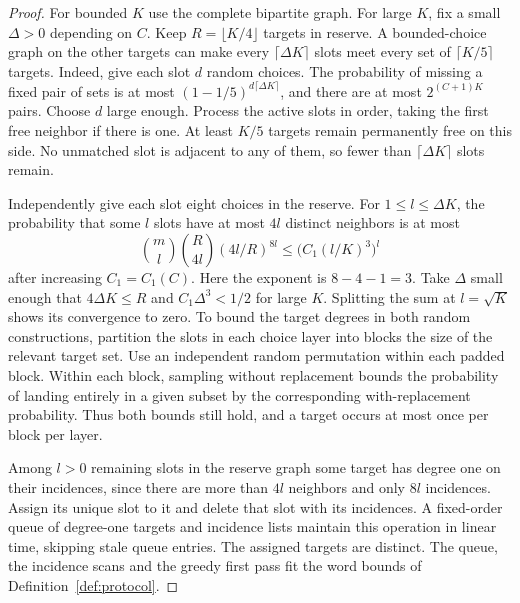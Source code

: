 \begin{proof}
For bounded $K$ use the complete bipartite graph. For large $K$, fix a small $\Delta>0$ depending
on $C$. Keep $R=\lfloor K/4\rfloor$ targets in reserve. A bounded-choice
graph on the other targets can make every $\lceil\Delta K\rceil$ slots
meet every set of $\lceil K/5\rceil$ targets. Indeed, give each slot
$d$ random choices. The probability of missing a fixed pair of sets
is at most $(1-1/5)^{d\lceil\Delta K\rceil}$, and there are at most
$2^{(C+1)K}$ pairs. Choose $d$ large enough. Process the active
slots in order, taking the first free neighbor if there is one.
At least $K/5$ targets remain permanently free on this side. No
unmatched slot is adjacent to any of them, so fewer than
$\lceil\Delta K\rceil$ slots remain.

Independently give each slot eight choices in the reserve. For
$1\le l\le\Delta K$, the probability that some $l$ slots have at most
$4l$ distinct neighbors is at most
\[
   \binom{m}{l}\binom{R}{4l}(4l/R)^{8l}
          \le \bigl(C_1(l/K)^3\bigr)^l
\]
after increasing $C_1=C_1(C)$. Here the exponent is $8-4-1=3$. Take $\Delta$ small enough that
$4\Delta K\le R$ and $C_1\Delta^3<1/2$ for large $K$.
Splitting the sum at $l=\sqrt K$ shows its convergence to zero.
To bound the target degrees in both random constructions, partition
the slots in each choice layer into blocks the size of the relevant
target set. Use an independent random permutation within each padded block. Within each block, sampling without replacement bounds the probability of
landing entirely in a given subset by the corresponding with-replacement
probability. Thus both bounds still hold, and a target occurs at most once
per block per layer.

Among $l>0$ remaining slots in the reserve graph some target has
degree one on their incidences, since there are more than $4l$
neighbors and only $8l$ incidences. Assign its unique slot to it
and delete that slot with its incidences. A fixed-order queue of
degree-one targets and incidence lists maintain this operation in
linear time, skipping stale queue entries. The assigned targets are
distinct. The queue, the incidence scans and the greedy first pass fit the word
bounds of Definition~\ref{def:protocol}.
\end{proof}

